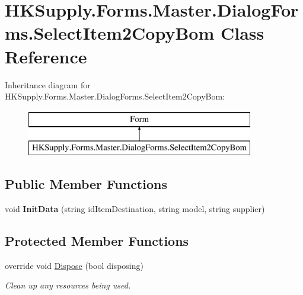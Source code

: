 \hypertarget{class_h_k_supply_1_1_forms_1_1_master_1_1_dialog_forms_1_1_select_item2_copy_bom}{}\section{H\+K\+Supply.\+Forms.\+Master.\+Dialog\+Forms.\+Select\+Item2\+Copy\+Bom Class Reference}
\label{class_h_k_supply_1_1_forms_1_1_master_1_1_dialog_forms_1_1_select_item2_copy_bom}
Inheritance diagram for H\+K\+Supply.\+Forms.\+Master.\+Dialog\+Forms.\+Select\+Item2\+Copy\+Bom\+:\begin{figure}[H]
\begin{center}
\leavevmode
\includegraphics[height=2.000000cm]{class_h_k_supply_1_1_forms_1_1_master_1_1_dialog_forms_1_1_select_item2_copy_bom}
\end{center}
\end{figure}
\subsection*{Public Member Functions}
\begin{DoxyCompactItemize}
\item 
\mbox{\label{class_h_k_supply_1_1_forms_1_1_master_1_1_dialog_forms_1_1_select_item2_copy_bom_a03a5d8ef3a4134992736079cda014aca}} 
void {\bfseries Init\+Data} (string id\+Item\+Destination, string model, string supplier)
\end{DoxyCompactItemize}
\subsection*{Protected Member Functions}
\begin{DoxyCompactItemize}
\item 
override void \mbox{\hyperlink{class_h_k_supply_1_1_forms_1_1_master_1_1_dialog_forms_1_1_select_item2_copy_bom_a2f3441993b283eb01930010719c378a8}{Dispose}} (bool disposing)
\begin{DoxyCompactList}\small\item\em Clean up any resources being used. \end{DoxyCompactList}\end{DoxyCompactItemize}
